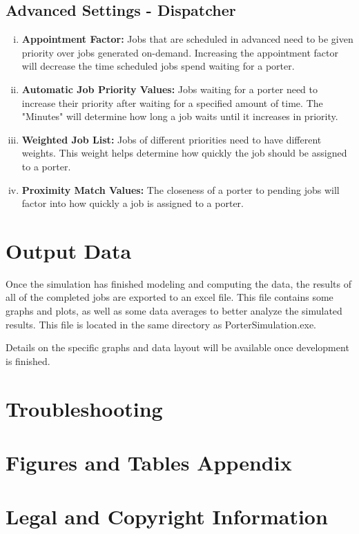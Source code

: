 \documentclass[paper=letter, fontsize=10pt]{scrartcl}
\numberwithin{equation}{section}		%
\numberwithin{figure}{section}			%
\numberwithin{table}{section}				%
\begin{document}
	\subsection{Advanced Settings - Dispatcher}
	\begin{enumerate}[(i)]
		\item \textbf{Appointment Factor:} Jobs that are scheduled in advanced need to be given priority over jobs generated on-demand.  Increasing the appointment factor will decrease the time scheduled jobs spend waiting for a porter.
		\item \textbf{Automatic Job Priority Values:} Jobs waiting for a porter need to increase their priority after waiting for a specified amount of time.  The "Minutes" will determine how long a job waits until it increases in priority.
		\item \textbf{Weighted Job List:} Jobs of different priorities need to have different weights.  This weight helps determine how quickly the job should be assigned to a porter.
		\item \textbf{Proximity Match Values:} The closeness of a porter to pending jobs will factor into how quickly a job is assigned to a porter.
	\end{enumerate}
	
\section{Output Data}
Once the simulation has finished modeling and computing the data, the results of all of the completed jobs are exported to an excel file. This file contains some graphs and plots, as well as some data averages to better analyze the simulated results. This file is located in the same directory as PorterSimulation.exe. 

Details on the specific graphs and data layout will be available once development is finished.

\section{Troubleshooting}

\section{Figures and Tables Appendix}

\section{Legal and Copyright Information}


\end{document}
